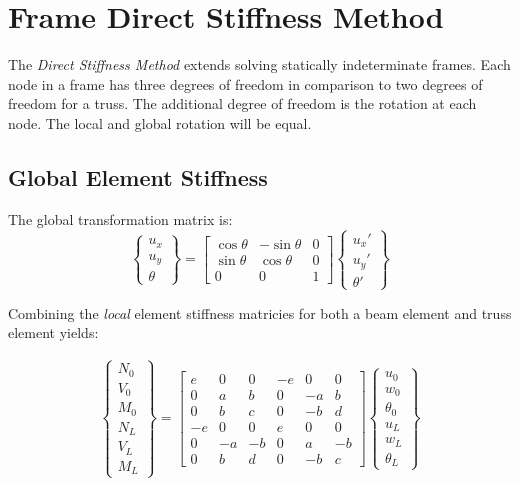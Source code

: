 \section{Frame Direct Stiffness Method}
The \textit{Direct Stiffness Method} extends solving statically indeterminate frames. Each node in a frame has three degrees of freedom in comparison to two degrees of freedom for a truss. The additional degree of freedom is the rotation at each node. The local and global rotation will be equal.

\subsection{Global Element Stiffness}

The global transformation matrix is:
\begin{equation}
	\begin{Bmatrix}
		u_x\\ u_y\\ \theta
	\end{Bmatrix}
	=
	\begin{bmatrix}
		\cos\theta & -\sin\theta & 0\\
		\sin\theta & \cos\theta & 0\\
		0 & 0 & 1
	\end{bmatrix}
	\begin{Bmatrix}
		u_x'\\ u_y'\\ \theta'
	\end{Bmatrix}
\end{equation}

Combining the \textit{local} element stiffness matricies for both a beam element and truss element yields:

\begin{align}
	\begin{Bmatrix}
		N_0\\ V_0\\ M_0\\ \hline N_L\\ V_L\\ M_L
	\end{Bmatrix}
	=
	\left[
	\begin{array}{c|cc|c|cc}
		e & 0 & 0 & -e & 0 & 0\\ \hline
		0 & a & b & 0 & -a & b\\
		0 & b & c & 0 & -b & d\\ \hline
		-e & 0 & 0 & e & 0 & 0\\ \hline
		0 & -a & -b & 0 & a & -b\\
		0 & b & d & 0 & -b & c
	\end{array}
	\right]
	\begin{Bmatrix}
		u_0\\ w_0\\ \theta_0\\ \hline u_L\\ w_L\\ \theta_L
	\end{Bmatrix}
\end{align}

